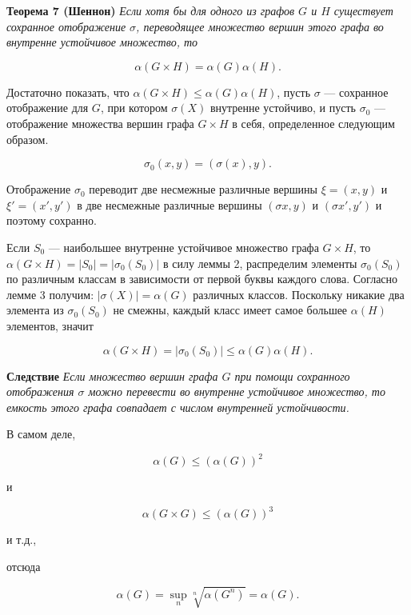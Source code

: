 \textbf{Теорема 7 (Шеннон)} \textit{Если хотя бы для одного из графов $G$ и $H$ существует сохранное отображение $\sigma$, переводящее множество вершин этого графа во внутренне устойчивое множество, то}

\[
\alpha(G \times H) = \alpha(G)\alpha(H).
\]

Достаточно показать, что $\alpha(G \times H) \leq \alpha(G)\alpha(H)$, пусть $\sigma$ — сохранное отображение для $G$, при котором $\sigma(X)$ внутренне устойчиво, и пусть $\sigma_0$ — отображение множества вершин графа $G \times H$ в себя, определенное следующим образом.

\[
\sigma_0(x, y) = (\sigma(x), y).
\]

Отображение $\sigma_0$ переводит две несмежные различные вершины $ξ = (x, y)$ и $ξ' = (x', y')$ в две несмежные различные вершины $(\sigma x, y)$ и $(\sigma x', y')$ и поэтому сохранно.

Если $S_0$ — наибольшее внутренне устойчивое множество графа $G \times H$, то $\alpha(G \times H) = |S_0| = |\sigma_0(S_0)|$ в силу леммы 2, распределим элементы $\sigma_0(S_0)$ по различным классам в зависимости от первой буквы каждого слова. Согласно лемме 3 получим: $|\sigma(X)| = \alpha(G)$ различных классов. Поскольку никакие два элемента из $\sigma_0(S_0)$ не смежны, каждый класс имеет самое большее $\alpha(H)$ элементов, значит

\[
\alpha(G \times H) = |\sigma_0(S_0)| \leq \alpha(G)\alpha(H).
\]

\textbf{Следствие} \textit{Если множество вершин графа $G$ при помощи сохранного отображения $\sigma$ можно перевести во внутренне устойчивое множество, то емкость этого графа совпадает с числом внутренней устойчивости.}

В самом деле,

\[
\alpha(G) \leq (\alpha(G))^2
\]

и

\[
\alpha(G \times G) \leq (\alpha(G))^3
\]

и т.д.,

отсюда

\[
\alpha(G) = \sup_n \sqrt[n]{\alpha(G^n)} = \alpha(G).
\]